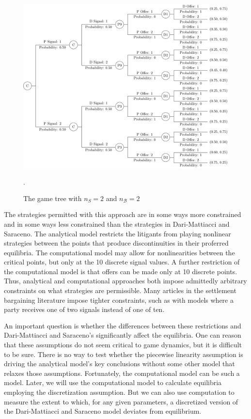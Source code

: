 \documentclass{article}
\begin{document}
\begin{figure}[h!]
\centering
\includegraphics[scale=0.50, trim={0in 0in 0in 0in}, clip]{../Figures/gametree.pdf}
\caption{The game tree with $n_S=2$ and $n_{\mathcal{B}}=2$}. 
\label{fig:gametree}
\end{figure}

The strategies permitted with this approach are in some ways more constrained and in some ways less constrained than the strategies in Dari-Mattiacci and Saraceno. The analytical model restricts the litigants from playing nonlinear strategies between the points that produce discontinuities in their proferred equilibria. The computational model may allow for nonlinearities between the critical points, but only at the 10 discrete signal values. A further restriction of the computational model is that offers can be made only at 10 discrete points. Thus, analytical and computational approaches both impose admittedly arbitrary constraints on what strategies are permissible. Many articles in the settlement bargaining literature impose tighter constraints, such as with models where a party receives one of two signals instead of one of ten. 

An important question is whether the differences between these restrictions and Dari-Mattiacci and Saraceno's significantly affect the equilibria. One can reason that these assumptions do not seem critical to game dynamics, but it is difficult to be sure. There is no way to test whether the piecewise linearity assumption is driving the analytical model's key conclusions without some other model that relaxes those assumptions. Fortunately, the computational model can be such a model. Later, we will use the computational model to calculate equilibria employing the discretization assumption. But we can also use computation to measure the extent to which, for any given parameters, a discretized version of the Dari-Mattiacci and Saraceno model deviates from equilibrium. 
\end{document}
